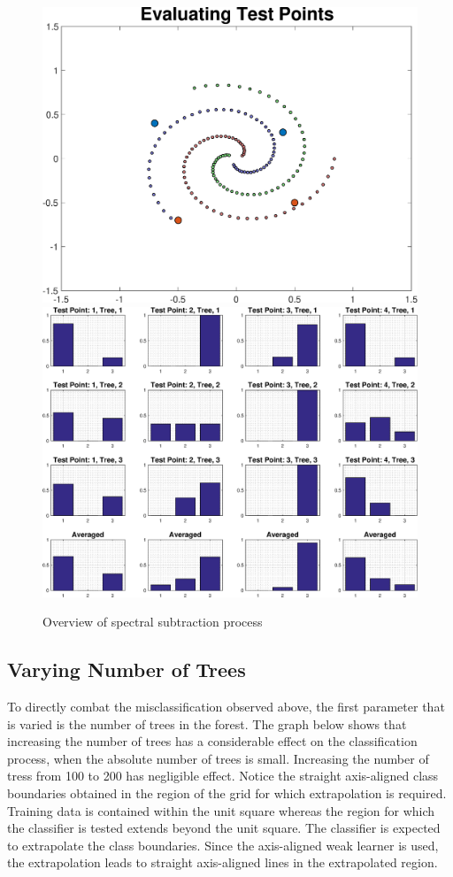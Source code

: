 \documentclass[a4paper,pra,twocolumn,10pt,aps,longbibliography,nobalancelastpage]{revtex4-1}
\begin{document}
\begin{figure}[H]
	\centering
    \includegraphics[width=0.49\columnwidth]{test_points_eval}
    \includegraphics[width=0.49\columnwidth]{test_points_hist}
    \caption{Overview of spectral subtraction process}
    \label{fig:leaf_nodes}
\end{figure}

\subsection{Varying Number of Trees}

To directly combat the misclassification observed above, the first parameter that is varied is the number of trees in the forest. The graph below shows that increasing the number of trees has a considerable effect on the classification process, when the absolute number of trees is small. Increasing the number of tress from 100 to 200 has negligible effect. Notice the straight axis-aligned class boundaries obtained in the region of the grid for which extrapolation is required. Training data is contained within the unit square whereas the region for which the classifier is tested extends beyond the unit square. The classifier is expected to extrapolate the class boundaries. Since the axis-aligned weak learner is used, the extrapolation leads to straight axis-aligned lines in the extrapolated region. 
\end{document}
